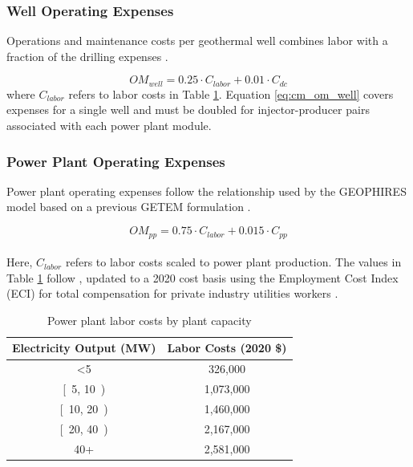 \subsubsection{Well Operating Expenses}\label{ch4:cm_opex_well}
Operations and maintenance costs per geothermal well combines labor with a fraction of the drilling expenses \citep[Equation 12,\ ][]{beckers_introducing_2013}.

\begin{equation}
\label{eq:cm_om_well}
    OM_{well} = 0.25 \cdot C_{labor} + 0.01 \cdot C_{dc}
\end{equation}
where $C_{labor}$ refers to labor costs in Table \ref{tab:labor_costs}. Equation \ref{eq:cm_om_well} covers expenses for a single well and must be doubled for injector-producer pairs associated with each power plant module.

\subsubsection{Power Plant Operating Expenses}\label{ch4:cm_opex_pp}
Power plant operating expenses follow the relationship used by the GEOPHIRES model based on a previous GETEM formulation \citep[Equation 9,\ ][]{beckers_introducing_2013}.

\begin{equation}
\label{eq:cm_om_pp}
    OM_{pp} = 0.75 \cdot C_{labor} + 0.015 \cdot C_{pp}
\end{equation}
\\
Here, $C_{labor}$ refers to labor costs scaled to power plant production. The values in Table \ref{tab:labor_costs} follow \citet[Equation 10,\ ][]{beckers_introducing_2013}, updated to a 2020 cost basis using the Employment Cost Index (ECI) for total compensation for private industry utilities workers \citep{us_bls_eci_2021}.

\begin{table}[!htp]
\centering
\begin{tabular}{|c|c|}
\hline
\textbf{Electricity Output (MW)} & \textbf{Labor Costs (2020 \$)} \\ \hline
\textless 5 & 326,000 \\ \hline
{[}\ 5, 10\ ) & 1,073,000 \\ \hline
{[}\ 10, 20\ ) & 1,460,000 \\ \hline
{[}\ 20, 40\ ) & 2,167,000 \\ \hline
40+ & 2,581,000 \\ \hline
\end{tabular}
\caption[Power plant labor costs]{Power plant labor costs by plant capacity  \protect\citep{beckers_introducing_2013}}
\label{tab:labor_costs}
\end{table}

